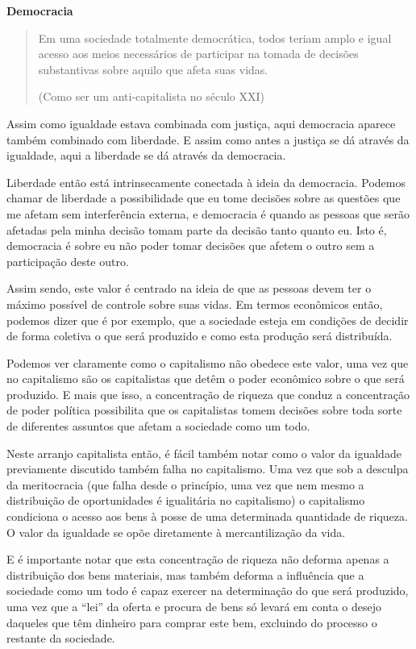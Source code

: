 \textbf{Democracia}

\begin{quote}
Em uma sociedade totalmente democrática, todos teriam amplo e igual acesso aos meios necessários de participar na tomada de decisões substantivas sobre aquilo que afeta suas vidas.

(Como ser um anti-capitalista no século XXI)
\end{quote}

Assim como igualdade estava combinada com justiça, aqui democracia aparece também combinado com liberdade. E assim como antes a justiça se dá através da igualdade, aqui a liberdade se dá através da democracia.

Liberdade então está intrinsecamente conectada à ideia da democracia. Podemos chamar de liberdade a possibilidade que eu tome decisões sobre as questões que me afetam sem interferência externa, e democracia é quando as pessoas que serão afetadas pela minha decisão tomam parte da decisão tanto quanto eu. Isto é, democracia é sobre eu não poder tomar decisões que afetem o outro sem a participação deste outro.

Assim sendo, este valor é centrado na ideia de que as pessoas devem ter o máximo possível de controle sobre suas vidas. Em termos econômicos então, podemos dizer que é por exemplo, que a sociedade esteja em condições de decidir de forma coletiva o que será produzido e como esta produção será distribuída.

Podemos ver claramente como o capitalismo não obedece este valor, uma vez que no capitalismo são os capitalistas que detêm o poder econômico sobre o que será produzido. E mais que isso, a concentração de riqueza que conduz a concentração de poder política possibilita que os capitalistas tomem decisões sobre toda sorte de diferentes assuntos que afetam a sociedade como um todo.

Neste arranjo capitalista então, é fácil também notar como o valor da igualdade previamente discutido também falha no capitalismo. Uma vez que sob a desculpa da meritocracia (que falha desde o princípio, uma vez que nem mesmo a distribuição de oportunidades é igualitária no capitalismo) o capitalismo condiciona o acesso aos bens à posse de uma determinada quantidade de riqueza. O valor da igualdade se opõe diretamente à mercantilização da vida.

E é importante notar que esta concentração de riqueza não deforma apenas a distribuição dos bens materiais, mas também deforma a influência que a sociedade como um todo é capaz exercer na determinação do que será produzido, uma vez que a “lei” da oferta e procura de bens só levará em conta o desejo daqueles que têm dinheiro para comprar este bem, excluindo do processo o restante da sociedade.

